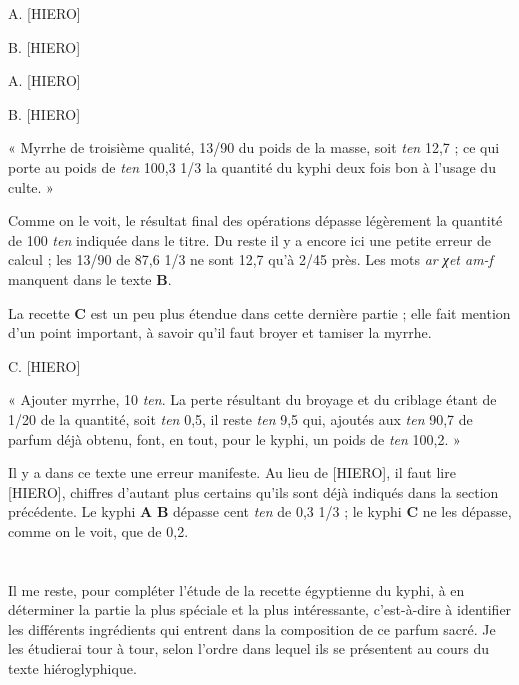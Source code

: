 \documentclass[a4paper, 11pt, oneside]{article}
\begin{document}
A. [HIERO]

B. [HIERO]

A. [HIERO]

B. [HIERO]

« Myrrhe de troisième qualité, 13/90 du poids de la masse, soit \emph{ten} 12,7 ; ce qui porte au poids de \emph{ten} 100,3 1/3 la quantité du kyphi deux fois bon à l'usage du culte. »

Comme on le voit, le résultat final des opérations dépasse légèrement la quantité de 100 \emph{ten} indiquée dans le titre. Du reste il y a encore ici une petite erreur de calcul ; les 13/90 de 87,6 1/3 ne sont 12,7 qu'à 2/45 près. Les mots \emph{ar χet am-f} manquent dans le texte \textbf{B}.

La recette \textbf{C} est un peu plus étendue dans cette dernière partie ; elle fait mention d'un point important, à savoir qu'il faut broyer et tamiser la myrrhe.

C. [HIERO]

« Ajouter myrrhe, 10 \emph{ten}. La perte résultant du broyage et du criblage étant de 1/20 de la quantité, soit \emph{ten} 0,5, il reste \emph{ten} 9,5 qui, ajoutés aux \emph{ten} 90,7 de parfum déjà obtenu, font, en tout, pour le kyphi, un poids de \emph{ten} 100,2. »

Il y a dans ce texte une erreur manifeste. Au lieu de [HIERO], il faut lire [HIERO], chiffres d'autant plus certains qu'ils sont déjà indiqués dans la section précédente. Le kyphi \textbf{A} \textbf{B} dépasse cent \emph{ten} de 0,3 1/3 ; le kyphi \textbf{C} ne les dépasse, comme on le voit, que de 0,2.
\clearpage
\section{}
\paragraph{}
Il me reste, pour compléter l'étude de la recette égyptienne du kyphi, à en déterminer la partie la plus spéciale et la plus intéressante, c'est-à-dire à identifier les différents ingrédients qui entrent dans la composition de ce parfum sacré. Je les étudierai tour à tour, selon l'ordre dans lequel ils se présentent au cours du texte hiéroglyphique.

\end{document}

